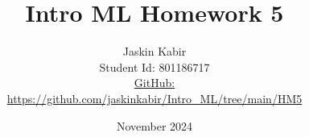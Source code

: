 \title{\Huge Intro ML Homework 5}

\author{ \huge
Jaskin Kabir \\
\Large Student Id: 801186717 \\
\Large \href{https://github.com/jaskinkabir/Intro_ML/tree/main/HM5}{GitHub:}\\\url{https://github.com/jaskinkabir/Intro_ML/tree/main/HM5}
}

\date{November 2024}

\begin{titlingpage}
\maketitle
\end{titlingpage}